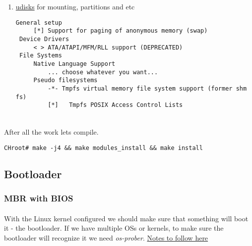 \documentclass[10pt,a4paper]{article}
\begin{document}
\begin{enumerate}
                    \newpage
                    \item \href{https://wiki.gentoo.org/wiki/Udisks#Kernel}{udisks} for mounting, partitions and etc
                    
                        \begin{lstlisting}[style=KernelConfig]
 General setup
     [*] Support for paging of anonymous memory (swap)
 Device Drivers
     < > ATA/ATAPI/MFM/RLL support (DEPRECATED)
 File Systems
     Native Language Support 
         ... choose whatever you want...
     Pseudo filesystems
         -*- Tmpfs virtual memory file system support (former shm fs)
         [*]   Tmpfs POSIX Access Control Lists
     
                        \end{lstlisting}
                    
                \end{enumerate}
                
                \newpage
                \paragraph{} After all the work lets compile. 
                
                \begin{lstlisting}[style=BashInputCHRoot]
 CHroot# make -j4 && make modules_install && make install
                \end{lstlisting}
            
            \newpage
            \subsection{Bootloader}
            
                \subsubsection{MBR with BIOS}
                    
                    \paragraph{} With the Linux kernel configured we should make sure that something will boot it - the bootloader. If we have multiple OSs or kernels, to make sure the bootloader will recognize it we need \textit{os-prober}. \href{https://wiki.gentoo.org/wiki/GRUB2}{Notes to follow here}
\end{document}
